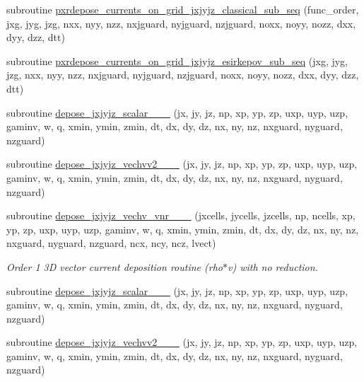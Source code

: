 \begin{DoxyCompactItemize}
\item 
subroutine \hyperlink{current__deposition_8_f90_a9cba9f74ee775de5a5f60eb97ff619a4}{pxrdepose\+\_\+currents\+\_\+on\+\_\+grid\+\_\+jxjyjz\+\_\+classical\+\_\+sub\+\_\+seq} (func\+\_\+order, jxg, jyg, jzg, nxx, nyy, nzz, nxjguard, nyjguard, nzjguard, noxx, noyy, nozz, dxx, dyy, dzz, dtt)
\item 
subroutine \hyperlink{current__deposition_8_f90_ac4575c491c1cfe9d048c6cb1b6d5fbdb}{pxrdepose\+\_\+currents\+\_\+on\+\_\+grid\+\_\+jxjyjz\+\_\+esirkepov\+\_\+sub\+\_\+seq} (jxg, jyg, jzg, nxx, nyy, nzz, nxjguard, nyjguard, nzjguard, noxx, noyy, nozz, dxx, dyy, dzz, dtt)
\item 
subroutine \hyperlink{current__deposition_8_f90_a7347c7791083dae1b946cdbdce60602f}{depose\+\_\+jxjyjz\+\_\+scalar\+\_\+\_\+\_} (jx, jy, jz, np, xp, yp, zp, uxp, uyp, uzp, gaminv, w, q, xmin, ymin, zmin,                                       dt, dx, dy, dz, nx, ny, nz, nxguard, nyguard, nzguard)
\item 
subroutine \hyperlink{current__deposition_8_f90_a084ed42e79187e34df1e5e49cb589e87}{depose\+\_\+jxjyjz\+\_\+vechvv2\+\_\+\_\+\_} (jx, jy, jz, np, xp, yp, zp, uxp, uyp, uzp, gaminv, w, q, xmin, ymin, zmin,                                       dt, dx, dy, dz, nx, ny, nz, nxguard, nyguard, nzguard)
\item 
subroutine \hyperlink{current__deposition_8_f90_a640df01330ec2f2b5ffcb43938a71db5}{depose\+\_\+jxjyjz\+\_\+vechv\+\_\+vnr\+\_\+\_\+\_} (jxcells, jycells, jzcells, np, ncells, xp, yp, zp,                                   uxp, uyp, uzp, gaminv, w, q, xmin, ymin, zmin,                                       dt, dx, dy, dz, nx, ny, nz, nxguard, nyguard, nzguard, ncx, ncy, ncz, lvect)
\begin{DoxyCompactList}\small\item\em Order 1 3D vector current deposition routine (rho$\ast$v) with no reduction. \end{DoxyCompactList}\item 
subroutine \hyperlink{current__deposition_8_f90_a3b2c43f71118a3d22ad1d1fea9494fa4}{depose\+\_\+jxjyjz\+\_\+scalar\+\_\+\_\+\_} (jx, jy, jz, np, xp, yp, zp, uxp, uyp, uzp, gaminv, w, q, xmin, ymin, zmin,                                       dt, dx, dy, dz, nx, ny, nz, nxguard, nyguard, nzguard)
\item 
subroutine \hyperlink{current__deposition_8_f90_a82878814b59bae3273786c1c0e92deb6}{depose\+\_\+jxjyjz\+\_\+vechvv2\+\_\+\_\+\_} (jx, jy, jz, np, xp, yp, zp, uxp, uyp, uzp, gaminv, w, q, xmin, ymin, zmin,                                       dt, dx, dy, dz, nx, ny, nz, nxguard, nyguard, nzguard)

\end{DoxyCompactItemize}
